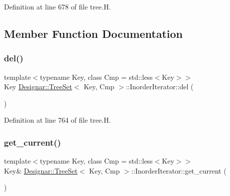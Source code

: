 Definition at line 678 of file tree.\+H.



\subsection{Member Function Documentation}
\mbox{\label{class_designar_1_1_tree_set_1_1_inorder_iterator_a137c29da7611999490f4a10a898b3c1d}} 
\subsubsection{\texorpdfstring{del()}{del()}}
{\footnotesize\ttfamily template$<$typename Key, class Cmp = std\+::less$<$\+Key$>$$>$ \\
Key \hyperlink{class_designar_1_1_tree_set}{Designar\+::\+Tree\+Set}$<$ Key, Cmp $>$\+::Inorder\+Iterator\+::del (\begin{DoxyParamCaption}{ }\end{DoxyParamCaption})\hspace{0.3cm}{\ttfamily [inline]}}



Definition at line 764 of file tree.\+H.

\mbox{\label{class_designar_1_1_tree_set_1_1_inorder_iterator_a48d0738cf18aa20c4a6161841324443d}} 
\subsubsection{\texorpdfstring{get\+\_\+current()}{get\_current()}\hspace{0.1cm}{\footnotesize\ttfamily [1/2]}}
{\footnotesize\ttfamily template$<$typename Key, class Cmp = std\+::less$<$\+Key$>$$>$ \\
Key\& \hyperlink{class_designar_1_1_tree_set}{Designar\+::\+Tree\+Set}$<$ Key, Cmp $>$\+::Inorder\+Iterator\+::get\+\_\+current (\begin{DoxyParamCaption}{ }\end{DoxyParamCaption})\hspace{0.3cm}{\ttfamily [inline]}}



